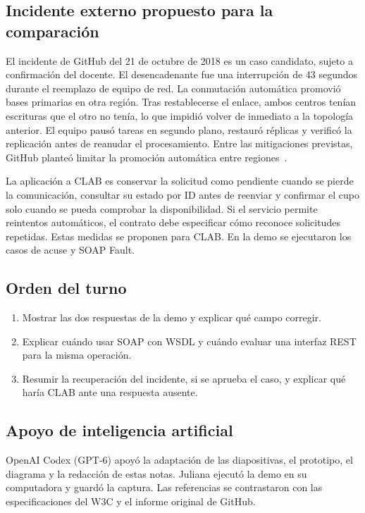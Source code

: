 \subsection{Incidente externo propuesto para la comparación}
El incidente de GitHub del 21 de octubre de 2018 es un caso candidato, sujeto a confirmación del docente. El desencadenante fue una interrupción de 43 segundos durante el reemplazo de equipo de red. La conmutación automática promovió bases primarias en otra región. Tras restablecerse el enlace, ambos centros tenían escrituras que el otro no tenía, lo que impidió volver de inmediato a la topología anterior. El equipo pausó tareas en segundo plano, restauró réplicas y verificó la replicación antes de reanudar el procesamiento. Entre las mitigaciones previstas, GitHub planteó limitar la promoción automática entre regiones~\cite{warner-github-incidente-2018}.

La aplicación a CLAB es conservar la solicitud como pendiente cuando se pierde la comunicación, consultar su estado por ID antes de reenviar y confirmar el cupo solo cuando se pueda comprobar la disponibilidad. Si el servicio permite reintentos automáticos, el contrato debe especificar cómo reconoce solicitudes repetidas. Estas medidas se proponen para CLAB. En la demo se ejecutaron los casos de acuse y SOAP Fault.

\subsection{Orden del turno}
\begin{enumerate}
  \item Mostrar las dos respuestas de la demo y explicar qué campo corregir.
  \item Explicar cuándo usar SOAP con WSDL y cuándo evaluar una interfaz REST para la misma operación.
  \item Resumir la recuperación del incidente, si se aprueba el caso, y explicar qué haría CLAB ante una respuesta ausente.
\end{enumerate}

\subsection{Apoyo de inteligencia artificial}
OpenAI Codex (GPT-6) apoyó la adaptación de las diapositivas, el prototipo, el diagrama y la redacción de estas notas. Juliana ejecutó la demo en su computadora y guardó la captura. Las referencias se contrastaron con las especificaciones del W3C y el informe original de GitHub.
